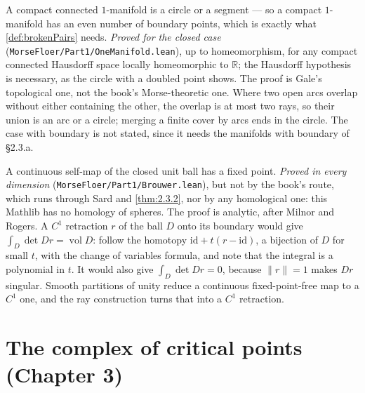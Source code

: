 \begin{theorem}[Theorem 2.3.2]
  \label{thm:2.3.2}
  \leanok
  A compact connected $1$-manifold is a circle or a segment --- so a compact
  $1$-manifold has an even number of boundary points, which is exactly what
  \ref{def:brokenPairs} needs.
  \emph{Proved for the closed case} (\texttt{MorseFloer/Part1/OneManifold.lean}),
  up to homeomorphism, for any compact connected Hausdorff space locally
  homeomorphic to $\mathbb{R}$; the Hausdorff hypothesis is necessary, as the
  circle with a doubled point shows.  The proof is Gale's topological one, not
  the book's Morse-theoretic one.  Where two open arcs overlap without either
  containing the other, the overlap is at most two rays, so their union is an
  arc or a circle; merging a finite cover by arcs ends in the circle.  The case
  with boundary is not stated, since it needs the manifolds with boundary of
  \S2.3.a.
\end{theorem}

\begin{theorem}
  \label{thm:2.3.3}
  \leanok
  A continuous self-map of the closed unit ball has a fixed point.
  \emph{Proved in every dimension} (\texttt{MorseFloer/Part1/Brouwer.lean}), but
  not by the book's route, which runs through Sard and \ref{thm:2.3.2}, nor by
  any homological one: this Mathlib has no homology of spheres.  The proof is
  analytic, after Milnor and Rogers.  A $C^1$ retraction $r$ of the ball $D$
  onto its boundary would give $\int_D \det Dr = \operatorname{vol} D$: follow
  the homotopy $\mathrm{id} + t(r - \mathrm{id})$, a bijection of $D$ for small
  $t$, with the change of variables formula, and note that the integral is a
  polynomial in $t$.  It would also give $\int_D \det Dr = 0$, because
  $\|r\| = 1$ makes $Dr$ singular.  Smooth partitions of unity reduce a
  continuous fixed-point-free map to a $C^1$ one, and the ray construction turns
  that into a $C^1$ retraction.
\end{theorem}

\chapter{The complex of critical points (Chapter 3)}

